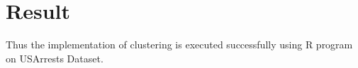 \documentclass[a4paper,10pt]{article}
\begin{document}

\section{Result}
Thus the implementation of clustering is executed successfully using R program on USArrests Dataset.
\end{document}
